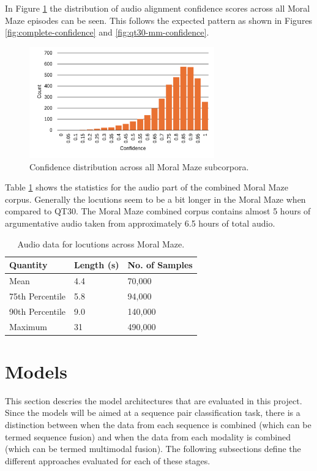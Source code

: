 \documentclass[twocolumn,twoside]{article}
\begin{document}
In Figure \ref{fig:moral-confidence} the distribution of audio alignment
confidence scores across all Moral Maze episodes can be seen. This
follows the expected pattern as shown in Figures
\ref{fig:complete-confidence} and \ref{fig:qt30-mm-confidence}.

\begin{figure}[h]
\centering
\includegraphics[width=8cm]{moral-confidence}
\caption{Confidence distribution across all Moral Maze subcorpora. \label{fig:moral-confidence}}
\end{figure}

Table \ref{tbl:audio-data-mm} shows the statistics for the audio part of
the combined Moral Maze corpus. Generally the locutions seem to be a bit
longer in the Moral Maze when compared to QT30. The Moral Maze combined
corpus contains almost 5 hours of argumentative audio taken from
approximately 6.5 hours of total audio.

\begin{table}[h]
\centering
\caption{Audio data for locutions across Moral Maze.\label{tbl:audio-data-mm}}
\begin{tabular}{|l|ll|}
\hline
Quantity        & Length (s) & No. of Samples \\ \hline
Mean            & 4.4        & 70,000         \\
75th Percentile & 5.8        & 94,000         \\
90th Percentile & 9.0        & 140,000        \\
Maximum         & 31         & 490,000        \\ \hline
\end{tabular}
\end{table}

\section{Models}\label{sec:models}

This section descries the model architectures that are evaluated in this
project. Since the models will be aimed at a sequence pair
classification task, there is a distinction between when the data from
each sequence is combined (which can be termed sequence fusion) and when
the data from each modality is combined (which can be termed multimodal
fusion). The following subsections define the different approaches
evaluated for each of these stages.
\end{document}
